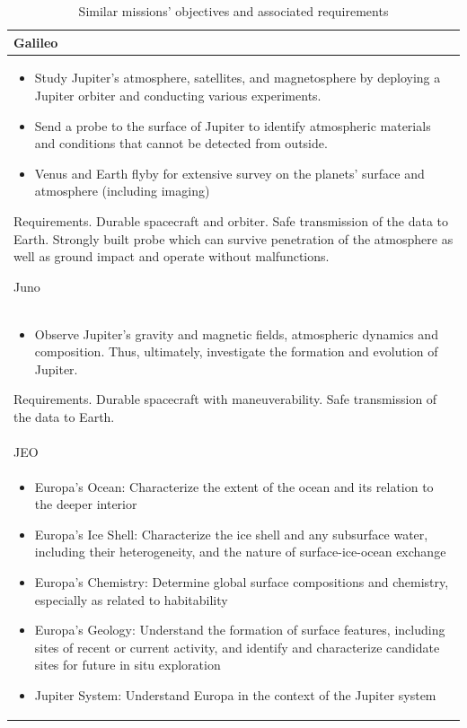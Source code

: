 \begin{longtable}{p{}}
  \caption{Similar missions' objectives and associated requirements}
  \\

  Galileo \\* \midrule

  \begin{itemize}
  \item Study Jupiter’s atmosphere, satellites, and magnetosphere by
    deploying a Jupiter orbiter and conducting various experiments.
  \item Send a probe to the surface of Jupiter to identify atmospheric
    materials and conditions that cannot be detected from outside.
  \item Venus and Earth flyby for extensive survey on the planets’
    surface and atmosphere (including imaging)
  \end{itemize}

  Requirements. Durable spacecraft and orbiter. Safe transmission of
  the data to Earth.  Strongly built probe which can survive
  penetration of the atmosphere as well as ground impact and operate
  without malfunctions.

  Juno \\* \midrule

  \begin{itemize}
  \item Observe Jupiter's gravity and magnetic fields, atmospheric
    dynamics and composition. Thus, ultimately, investigate the
    formation and evolution of Jupiter.
  \end{itemize}

  Requirements. Durable spacecraft with maneuverability. Safe
  transmission of the data to Earth. \\

  JEO \\* \midrule

  \begin{itemize}
  \item Europa’s Ocean: Characterize the extent of the ocean and its
    relation to the deeper interior
  \item Europa’s Ice Shell: Characterize the ice shell and any
    subsurface water, including their heterogeneity, and the nature of
    surface-ice-ocean exchange
  \item Europa’s Chemistry: Determine global surface compositions and
    chemistry, especially as related to habitability
  \item Europa’s Geology: Understand the formation of surface
    features, including sites of recent or current activity, and
    identify and characterize candidate sites for future in situ
    exploration
  \item Jupiter System: Understand Europa in the context of the
    Jupiter system
  \end{itemize} \\


\end{longtable}
